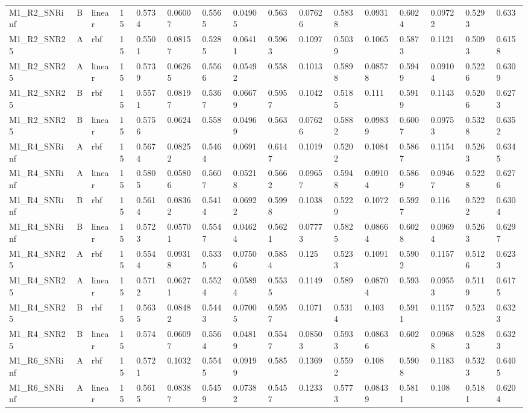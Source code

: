 \begin{tabular}{llllllllllllllll}
M1\_R2\_SNRinf & B & linear & 15 & 0.5734 & 0.06007 & 0.5565 & 0.04905 & 0.563 & 0.07626 & 0.5838 & 0.0931 & 0.6024 & 0.09722 & 0.5293 & 0.633 \\
M1\_R2\_SNR25 & A & rbf & 15 & 0.5501 & 0.08157 & 0.5285 & 0.06411 & 0.5963 & 0.1097 & 0.5039 & 0.1065 & 0.5873 & 0.1121 & 0.5093 & 0.6158 \\
M1\_R2\_SNR25 & A & linear & 15 & 0.5739 & 0.06265 & 0.5566 & 0.05492 & 0.558 & 0.1013 & 0.5898 & 0.08578 & 0.5949 & 0.09104 & 0.5226 & 0.6309 \\
M1\_R2\_SNR25 & B & rbf & 15 & 0.5571 & 0.08197 & 0.5367 & 0.06679 & 0.5957 & 0.1042 & 0.5185 & 0.111 & 0.5919 & 0.1143 & 0.5206 & 0.6273 \\
M1\_R2\_SNR25 & B & linear & 15 & 0.5756 & 0.0624 & 0.558 & 0.04969 & 0.563 & 0.07626 & 0.5882 & 0.09839 & 0.6007 & 0.09753 & 0.5328 & 0.6352 \\
M1\_R4\_SNRinf & A & rbf & 15 & 0.5674 & 0.08252 & 0.5464 & 0.0691 & 0.6147 & 0.1019 & 0.5202 & 0.1084 & 0.5867 & 0.1154 & 0.5263 & 0.6345 \\
M1\_R4\_SNRinf & A & linear & 15 & 0.5805 & 0.05806 & 0.5607 & 0.05218 & 0.5662 & 0.09657 & 0.5948 & 0.09104 & 0.5869 & 0.09467 & 0.5228 & 0.6276 \\
M1\_R4\_SNRinf & B & rbf & 15 & 0.5614 & 0.08362 & 0.5414 & 0.06922 & 0.5998 & 0.1038 & 0.5229 & 0.1072 & 0.5927 & 0.116 & 0.5222 & 0.6304 \\
M1\_R4\_SNRinf & B & linear & 15 & 0.5723 & 0.05701 & 0.5547 & 0.04624 & 0.5621 & 0.07773 & 0.5825 & 0.08664 & 0.6028 & 0.09694 & 0.5263 & 0.6297 \\
M1\_R4\_SNR25 & A & rbf & 15 & 0.5544 & 0.09318 & 0.5335 & 0.07506 & 0.5854 & 0.125 & 0.5233 & 0.1091 & 0.5902 & 0.1157 & 0.5126 & 0.6233 \\
M1\_R4\_SNR25 & A & linear & 15 & 0.5712 & 0.06271 & 0.5524 & 0.05894 & 0.5535 & 0.1149 & 0.589 & 0.08704 & 0.593 & 0.09553 & 0.5119 & 0.6175 \\
M1\_R4\_SNR25 & B & rbf & 15 & 0.5635 & 0.08482 & 0.5443 & 0.07005 & 0.5957 & 0.1071 & 0.5314 & 0.103 & 0.5911 & 0.1157 & 0.523 & 0.6323 \\
M1\_R4\_SNR25 & B & linear & 15 & 0.574 & 0.06097 & 0.5564 & 0.04819 & 0.5547 & 0.08503 & 0.5933 & 0.08636 & 0.602 & 0.09688 & 0.5283 & 0.6323 \\
M1\_R6\_SNRinf & A & rbf & 15 & 0.5721 & 0.1032 & 0.5545 & 0.09199 & 0.585 & 0.1369 & 0.5592 & 0.108 & 0.5908 & 0.1183 & 0.5323 & 0.6405 \\
M1\_R6\_SNRinf & A & linear & 15 & 0.5615 & 0.08387 & 0.5459 & 0.07382 & 0.5457 & 0.1233 & 0.5773 & 0.08439 & 0.5811 & 0.108 & 0.5181 & 0.6204 \\

\end{tabular}
